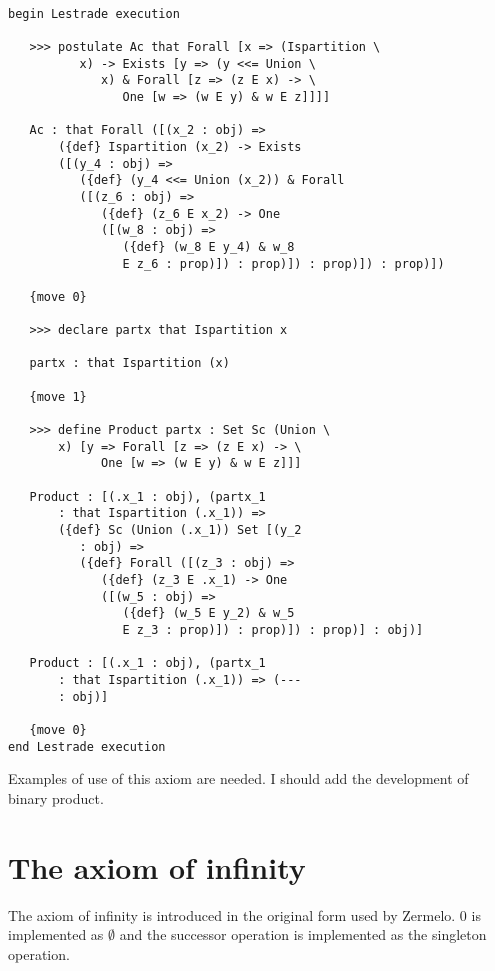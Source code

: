 \documentclass[12pt]{article}
\begin{document}
\begin{verbatim}

begin Lestrade execution

   >>> postulate Ac that Forall [x => (Ispartition \
          x) -> Exists [y => (y <<= Union \
             x) & Forall [z => (z E x) -> \
                One [w => (w E y) & w E z]]]]

   Ac : that Forall ([(x_2 : obj) => 
       ({def} Ispartition (x_2) -> Exists 
       ([(y_4 : obj) => 
          ({def} (y_4 <<= Union (x_2)) & Forall 
          ([(z_6 : obj) => 
             ({def} (z_6 E x_2) -> One 
             ([(w_8 : obj) => 
                ({def} (w_8 E y_4) & w_8 
                E z_6 : prop)]) : prop)]) : prop)]) : prop)])

   {move 0}

   >>> declare partx that Ispartition x

   partx : that Ispartition (x)

   {move 1}

   >>> define Product partx : Set Sc (Union \
       x) [y => Forall [z => (z E x) -> \
             One [w => (w E y) & w E z]]]

   Product : [(.x_1 : obj), (partx_1 
       : that Ispartition (.x_1)) => 
       ({def} Sc (Union (.x_1)) Set [(y_2 
          : obj) => 
          ({def} Forall ([(z_3 : obj) => 
             ({def} (z_3 E .x_1) -> One 
             ([(w_5 : obj) => 
                ({def} (w_5 E y_2) & w_5 
                E z_3 : prop)]) : prop)]) : prop)] : obj)]

   Product : [(.x_1 : obj), (partx_1 
       : that Ispartition (.x_1)) => (--- 
       : obj)]

   {move 0}
end Lestrade execution
\end{verbatim}

Examples of use of this axiom are needed.  I should add the development of binary product.


\section{The axiom of infinity}

The axiom of infinity is introduced in the original form used by Zermelo.  0 is implemented as $\emptyset$ and the successor operation is implemented as the singleton operation.
\end{document}
